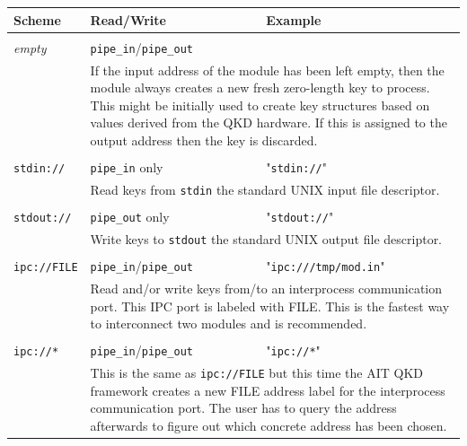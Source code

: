 \begin{table}[h!]
    \begin{tabular}{llp{8cm}}
    Scheme                  &   Read/Write                              &   Example \\
    \hline
    \\
    \emph{empty}            &   \texttt{pipe\_in}/\texttt{pipe\_out}    &                                   \\ [0.7em]   
    & \multicolumn{2}{p{11cm}}{If the input address of the module has been left empty, then the module always creates a new fresh zero-length key to process. This might be initially used to create key structures based on values derived from the QKD hardware. If this is assigned to the output address then the key is discarded.} \\ [0.7em]    
    \\
    \texttt{stdin://}       &   \texttt{pipe\_in} only                  &  "\texttt{stdin://}"                \\ [0.7em]   
    & \multicolumn{2}{p{11cm}}{Read keys from \texttt{stdin} the standard UNIX input file descriptor.}\\ [0.7em]    
    \\
    \texttt{stdout://}      &   \texttt{pipe\_out} only                 &  "\texttt{stdout://}"               \\ [0.7em]
    & \multicolumn{2}{p{11cm}}{Write keys to \texttt{stdout} the standard UNIX output file descriptor.}\\ [0.7em]    
    \\
    \texttt{ipc://FILE}     &   \texttt{pipe\_in}/\texttt{pipe\_out}    &  "\texttt{ipc:///tmp/mod.in}"       \\ [0.7em]
    & \multicolumn{2}{p{11cm}}{Read and/or write keys from/to an interprocess communication port. This IPC port is labeled with FILE. This is the fastest way to interconnect two modules and is recommended.}\\ [0.7em]    
    \\
    \texttt{ipc://*}        &   \texttt{pipe\_in}/\texttt{pipe\_out}    &  "\texttt{ipc://*}"                 \\ [0.7em]
    & \multicolumn{2}{p{11cm}}{This is the same as \texttt{ipc://FILE} but this time the AIT QKD framework creates a new FILE address label for the interprocess communication port. The user has to query the address afterwards to figure out which concrete address has been chosen.}\\ [0.7em]    

\end{tabular}
\end{table}

